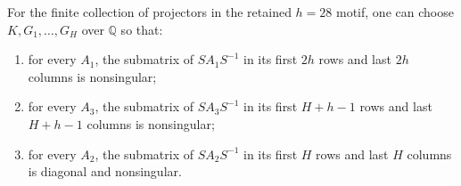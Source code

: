 \begin{lemma}
\label{lem:controlled-projector-basis}
For the finite collection of projectors in the retained $h=28$ motif,
one can choose $K,G_1,\ldots,G_H$ over $\mathbb Q$ so that:
\begin{enumerate}
\item for every $A_1$, the submatrix of $SA_1S^{-1}$ in its first
      $2h$ rows and last $2h$ columns is nonsingular;
\item for every $A_3$, the submatrix of $SA_3S^{-1}$ in its first
      $H+h-1$ rows and last $H+h-1$ columns is nonsingular;
\item for every $A_2$, the submatrix of $SA_2S^{-1}$ in its first
      $H$ rows and last $H$ columns is diagonal and nonsingular.
\end{enumerate}
\end{lemma}
